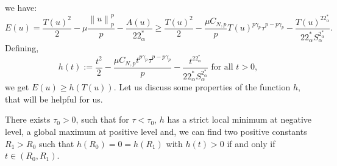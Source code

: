 \documentclass[11pt]{article}
\numberwithin{equation}{section}
\numberwithin{mytheorem}{section}
\begin{document}
		we have:
		\begin{equation}\label{2.3}
			E(u)  =  \frac{T(u)^2}{2}-\mu\frac{\left\| u \right\|_p^p}{p} -\frac{A(u)}{22^*_{\alpha}}
			\geq  \frac{T(u)^2}{2}-\frac{\mu C_{N,p}}{p}T(u)^{p\gamma_p}\tau^{p-p\gamma_p}-\frac{T(u)^{22^*_{\alpha}}}{22^*_{\alpha}S_{\alpha}^{2^*_{\alpha}}}.
		\end{equation}
		Defining,
		$$h(t):=\frac{t^2}{2}-\frac{\mu C_{N,p}t^{p\gamma_p}\tau^{p-p\gamma_p}}{p}-\frac{t^{22^*_{\alpha}}}{22^*_{\alpha}S_{\alpha}^{2^*_{\alpha}}} \text{ for all } t>0,$$
		we get $E(u)\geq h(T(u))$. Let us discuss some properties of the function $h$, that will be helpful for us.
		\begin{lemma}\label{Lemma 2.2}
			There exists $\tau_0>0$, such that
			for $\tau<\tau_0$, $h$ has a strict local minimum at negative level, a global maximum at  positive level and, we can find two positive constants $R_1>R_0$ such that $h(R_0)=0=h(R_1)$ with $h(t)>0$ if and only if $t\in (R_0,R_1)$.
		\end{lemma}
\end{document}
